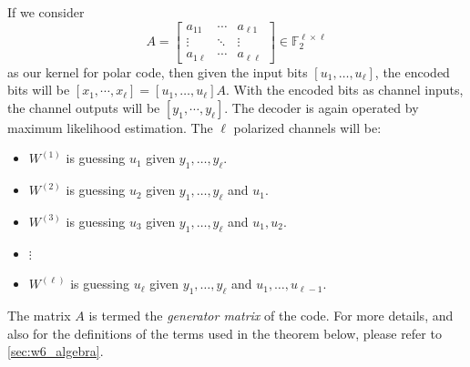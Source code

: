 If we consider
\begin{equation*}
    A = \left[\begin{matrix}
        a_{11} & \cdots & a_{\ell1} \\
        \vdots & \ddots & \vdots \\
        a_{1\ell} & \cdots & a_{\ell\ell}
    \end{matrix}\right] \in \mathbb{F}_2^{\ell\times\ell}
\end{equation*}
as our kernel for polar code, then given the input bits $[u_1,\ldots,u_\ell]$, the encoded bits will be $[x_1,\cdots,x_\ell] = [u_1,\ldots,u_\ell] A$. With the encoded bits as channel inputs, the channel outputs will be $[y_1,\cdots,y_\ell]$. The decoder is again operated by maximum likelihood estimation. The $\ell$ polarized channels will be:
\begin{itemize}
    \item $W^{(1)}$ is guessing $u_1$ given $y_1,\ldots,y_\ell$.
    \item $W^{(2)}$ is guessing $u_2$ given $y_1,\ldots,y_\ell$ and $u_1$.
    \item $W^{(3)}$ is guessing $u_3$ given $y_1,\ldots,y_\ell$ and $u_1,u_2$.
    \item $\vdots$
    \item $W^{(\ell)}$ is guessing $u_\ell$ given $y_1,\ldots,y_\ell$ and $u_1,\ldots,u_{\ell-1}$.
\end{itemize}
The matrix $A$ is termed the \textit{generator matrix} of the code. For more details, and also for the definitions of the terms used in the theorem below, please refer to \autoref{sec:w6_algebra}.

